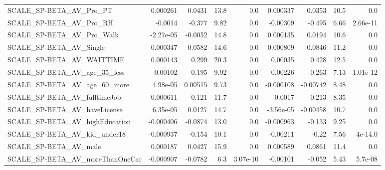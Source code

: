 \begin{tabular}{lrrrrrrrr}
SCALE\_SP-BETA\_AV\_Pro\_PT                            &    0.000261 &       0.0431 &      13.8 &      0.0 &   0.000337 &      0.0353 &         10.5 &           0.0 \\
SCALE\_SP-BETA\_AV\_Pro\_RH                            &     -0.0014 &       -0.377 &      9.82 &      0.0 &   -0.00309 &      -0.495 &         6.66 &      2.66e-11 \\
SCALE\_SP-BETA\_AV\_Pro\_Walk                          &   -2.27e-05 &      -0.0052 &      14.8 &      0.0 &   0.000135 &      0.0194 &         10.6 &           0.0 \\
SCALE\_SP-BETA\_AV\_Single                            &    0.000347 &       0.0582 &      14.6 &      0.0 &   0.000809 &      0.0846 &         11.2 &           0.0 \\
SCALE\_SP-BETA\_AV\_WAITTIME                          &    0.000143 &        0.299 &      20.3 &      0.0 &    0.00035 &       0.428 &         12.5 &           0.0 \\
SCALE\_SP-BETA\_AV\_age\_35\_less                       &    -0.00102 &       -0.195 &      9.92 &      0.0 &   -0.00226 &      -0.263 &         7.13 &      1.01e-12 \\
SCALE\_SP-BETA\_AV\_age\_60\_more                       &    4.98e-05 &      0.00515 &      9.73 &      0.0 &  -0.000108 &    -0.00742 &         8.48 &           0.0 \\
SCALE\_SP-BETA\_AV\_fulltimeJob                       &   -0.000611 &       -0.121 &      11.7 &      0.0 &    -0.0017 &      -0.213 &         8.35 &           0.0 \\
SCALE\_SP-BETA\_AV\_haveLicense                       &    6.35e-05 &       0.0127 &      14.7 &      0.0 &  -3.56e-05 &    -0.00458 &         10.7 &           0.0 \\
SCALE\_SP-BETA\_AV\_highEducation                     &   -0.000406 &      -0.0874 &      13.0 &      0.0 &  -0.000963 &      -0.133 &         9.25 &           0.0 \\
SCALE\_SP-BETA\_AV\_kid\_under18                       &   -0.000937 &       -0.154 &      10.1 &      0.0 &   -0.00211 &       -0.22 &         7.56 &       4e-14.0 \\
SCALE\_SP-BETA\_AV\_male                              &    0.000187 &       0.0427 &      15.9 &      0.0 &   0.000589 &      0.0861 &         11.4 &           0.0 \\
SCALE\_SP-BETA\_AV\_moreThanOneCar                    &   -0.000907 &      -0.0782 &       6.3 & 3.07e-10 &   -0.00101 &      -0.052 &         5.43 &       5.7e-08 \\

\end{tabular}
